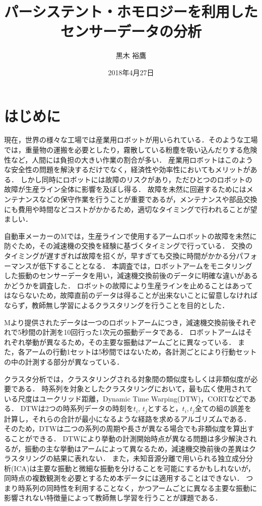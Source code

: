 \documentclass{jarticle}
\title{パーシステント・ホモロジーを利用したセンサーデータの分析}
\author{黒木 裕鷹}
\date{2018年4月27日}
\begin{document}
\maketitle
\section{はじめに}
現在，世界の様々な工場では産業用ロボットが用いられている．そのような工場では，重量物の運搬を必要としたり，霧散している粉塵を吸い込んだりする危険性など，人間には負担の大きい作業の割合が多い．
産業用ロボットはこのような安全性の問題を解決するだけでなく，経済性や効率性においてもメリットがある．
しかし同時にロボットには故障のリスクがあり，ただひとつのロボットの故障が生産ライン全体に影響を及ぼし得る．
故障を未然に回避するためにはメンテナンスなどの保守作業を行うことが重要であるが，メンテナンスや部品交換にも費用や時間などコストがかかるため，適切なタイミングで行われることが望ましい．


自動車メーカーのMでは，生産ラインで使用するアームロボットの故障を未然に防ぐため，その減速機の交換を経験に基づくタイミングで行っている．
交換のタイミングが遅すぎれば故障を招くが，早すぎても交換に時間がかかる分パフォーマンスが低下することとなる．
本調査では，ロボットアームをモニタリングした振動のセンサーデータを用い，減速機交換前後のデータに明確な違いがあるかどうかを調査した．
ロボットの故障により生産ラインを止めることはあってはならないため，故障直前のデータは得ることが出来ないことに留意しなければならず，教師無し学習によるクラスタリングを行うことを目的とした．


Mより提供されたデータは一つのロボットアームにつき，減速機交換前後それぞれで5秒間の計測を10回行った1次元の振動データである．
ロボットアームはそれぞれ挙動が異なるため，その主要な振動はアームごとに異なっている．
また，各アームの行動1セットは5秒間ではないため，各計測ごとにより行動セットの中の計測する部分が異なっている．

クラスタ分析では，クラスタリングされる対象間の類似度もしくは非類似度が必要である．
時系列を対象としたクラスタリングにおいて，最も広く使用されている尺度はユークリッド距離，Dynamic Time Warping(DTW)\cite{Berndt1996}，CORT\cite{Chouakria2007}などである．
DTWは2つの時系列データの時刻を$t_i$, $t_j$とすると，$t_i,t_j$全ての組の誤差を計算し，それらの合計が最小になるような経路を求めるアルゴリズムである．
そのため，DTWは二つの系列の周期や長さが異なる場合でも非類似度を算出することができる．
DTWにより挙動の計測開始時点が異なる問題は多少解決されるが，振動の主な挙動はアームによって異なるため，減速機交換前後の差異はクラスタリングの結果に表れない．
また，未知音源分離で用いられる独立成分分析(ICA)は主要な振動と微細な振動を分けることを可能にするかもしれないが，同時点の複数観測を必要とするため本データには適用することはできない．
つまり時系列の同時性を利用することなく，かつアームごとに異なる主要な振動に影響されない特徴量によって教師無し学習を行うことが課題である．
\end{document}
